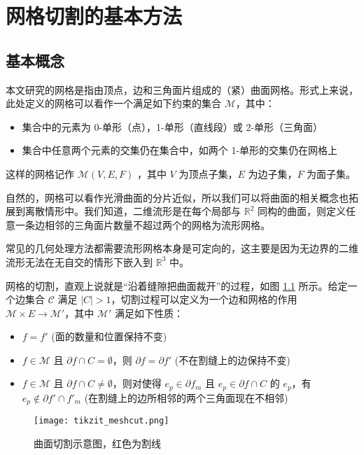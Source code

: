 
\chapter{网格切割的基本方法}

\section{基本概念}

本文研究的网格是指由顶点，边和三角面片组成的（紧）曲面网格。形式上来说，此处定义的网格可以看作一个满足如下约束的集合 $ \mathcal M $，其中：
\begin{itemize}
  \item 集合中的元素为 0-单形（点），1-单形（直线段）或 2-单形（三角面）
  \item 集合中任意两个元素的交集仍在集合中，如两个 1-单形的交集仍在网格上
\end{itemize}

这样的网格记作 $ \mathcal{M} (V, E, F) $ ，其中 $ V $ 为顶点子集，$ E $ 为边子集，$ F $ 为面子集。

自然的，网格可以看作光滑曲面的分片近似，所以我们可以将曲面的相关概念也拓展到离散情形中。我们知道，二维流形是在每个局部与 $ \mathbb{R}^2 $ 同构的曲面，则定义任意一条边相邻的三角面片数量不超过两个的网格为流形网格。

常见的几何处理方法都需要流形网格本身是可定向的，这主要是因为无边界的二维流形无法在无自交的情形下嵌入到 $ \mathbb{R}^3 $ 中。

网格的切割，直观上说就是“沿着缝隙把曲面裁开”的过程，如图 \ref{fig:meshcut} 所示。给定一个边集合 $ \mathcal C $ 满足 $ |C| > 1 $，切割过程可以定义为一个边和网格的作用 $ \mathcal{M} \times E \to \mathcal{M'} $，其中 $ \mathcal{M'} $ 满足如下性质：
\begin{itemize}
  \item $ f = f' $ \quad (面的数量和位置保持不变)
  \item $ f \in \mathcal{M} $ 且 $ \partial f \cap C = \emptyset $，则 $ \partial f = \partial f' $  \quad (不在割缝上的边保持不变)
  \item $ f \in \mathcal{M} $ 且 $ \partial f \cap C \ne \emptyset$，则对使得 $ e_p \in \partial f_m $ 且 $ e_p \in \partial f \cap C $ 的 $ e_p $，有 $ e_p \notin \partial f' \cap f'_m $  \quad (在割缝上的边所相邻的两个三角面现在不相邻)
\end{itemize}

\begin{figure}[h]
  \centering
  \texttt{[image: tikzit\_meshcut.png]}
  \caption{曲面切割示意图，红色为割线}
  \label{fig:meshcut}
\end{figure}

